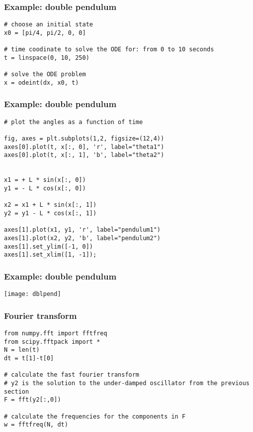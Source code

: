 \begin{frame}[fragile]\frametitle{Example: double pendulum}
\begin{lstlisting}
# choose an initial state
x0 = [pi/4, pi/2, 0, 0]

# time coodinate to solve the ODE for: from 0 to 10 seconds
t = linspace(0, 10, 250)

# solve the ODE problem
x = odeint(dx, x0, t)
\end{lstlisting}
\end{frame}

\begin{frame}[fragile]\frametitle{Example: double pendulum}
\begin{lstlisting}
# plot the angles as a function of time

fig, axes = plt.subplots(1,2, figsize=(12,4))
axes[0].plot(t, x[:, 0], 'r', label="theta1")
axes[0].plot(t, x[:, 1], 'b', label="theta2")


x1 = + L * sin(x[:, 0])
y1 = - L * cos(x[:, 0])

x2 = x1 + L * sin(x[:, 1])
y2 = y1 - L * cos(x[:, 1])
    
axes[1].plot(x1, y1, 'r', label="pendulum1")
axes[1].plot(x2, y2, 'b', label="pendulum2")
axes[1].set_ylim([-1, 0])
axes[1].set_xlim([1, -1]);
\end{lstlisting}
\end{frame}

\begin{frame}[fragile]\frametitle{Example: double pendulum}
\begin{center}
\texttt{[image: dblpend]}
\end{center}
\end{frame}

\begin{frame}[fragile]\frametitle{Fourier transform}
\begin{lstlisting}
from numpy.fft import fftfreq
from scipy.fftpack import *
N = len(t)
dt = t[1]-t[0]

# calculate the fast fourier transform
# y2 is the solution to the under-damped oscillator from the previous section
F = fft(y2[:,0]) 

# calculate the frequencies for the components in F
w = fftfreq(N, dt)
\end{lstlisting}
\end{frame}


